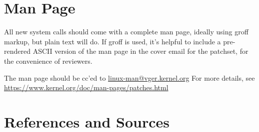 \documentclass[a4paper,8pt,english]{sphinxmanual}
\begin{document}
\section{Man Page}
\label{process/adding-syscalls:man-page}
All new system calls should come with a complete man page, ideally using groff
markup, but plain text will do.  If groff is used, it's helpful to include a
pre-rendered ASCII version of the man page in the cover email for the
patchset, for the convenience of reviewers.

The man page should be cc'ed to \href{mailto:linux-man@vger.kernel.org}{linux-man@vger.kernel.org}
For more details, see \href{https://www.kernel.org/doc/man-pages/patches.html}{https://www.kernel.org/doc/man-pages/patches.html}


\section{References and Sources}
\end{document}

